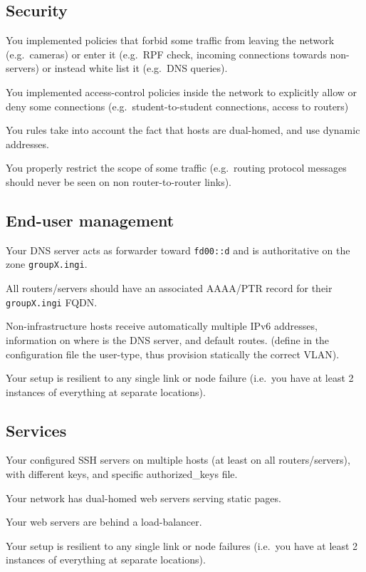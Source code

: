 \documentclass[a4paper,12pt]{article}
\begin{document}
\subsection{Security}
\begin{checklist}
    \item You implemented policies that forbid some traffic from leaving the
        network (e.g.\ cameras) or enter it (e.g.\ RPF check, incoming
        connections towards non-servers) or instead white list it (e.g.\ DNS
        queries).
    \item You implemented access-control policies inside the network to
        explicitly allow or deny some connections (e.g.\ student-to-student
        connections, access to routers)
    \item You rules take into account the fact that hosts are dual-homed, and
        use dynamic addresses.
    \item You properly restrict the scope of some traffic (e.g.\ routing
        protocol messages should never be seen on non router-to-router links).
\end{checklist}

\subsection{End-user management}
\begin{checklist}
    \item Your DNS server acts as forwarder toward \texttt{fd00:{}:d} and is
        authoritative on the zone \texttt{groupX.ingi}.
    \item All routers/servers should have an associated AAAA/PTR record for
        their \texttt{groupX.ingi} FQDN.\@
    \item Non-infrastructure hosts receive automatically multiple IPv6
        addresses, information on where is the DNS server, and default routes.
        (define in
        the configuration file the user-type, thus provision statically the
        correct VLAN).
    \item Your setup is resilient to any single link or node failure (i.e.\
        you have at least 2 instances of everything at separate locations).
\end{checklist}

\subsection{Services}
\begin{checklist}
    \item Your configured SSH servers on multiple hosts (at least on all
        routers/servers), with different keys, and specific authorized\_keys
        file.
    \item Your network has dual-homed web servers serving static pages.
    \item Your web servers are behind a load-balancer.
    \item Your setup is resilient to any single link or node failures (i.e.\
        you have at least 2 instances of everything at separate locations).
\end{checklist}
\end{document}
